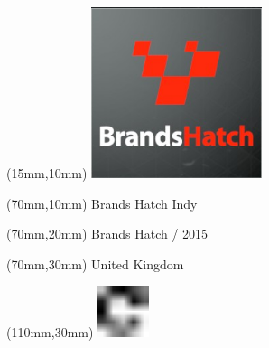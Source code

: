 \null\newpage
\begin{textblock*}{50mm}(15mm,10mm)%
\includegraphics[width=50mm]{LG/2015-05-20_00074.png}
\end{textblock*}
\begin{textblock*}{130mm}(70mm,10mm)%
{\fontsize{20}{20}\selectfont Brands Hatch Indy}\\
\end{textblock*}
\begin{textblock*}{120mm}(70mm,20mm)%
{\fontsize{16}{16}\selectfont Brands Hatch / 2015}\\
\end{textblock*}
\begin{textblock*}{120mm}(70mm,30mm)%
{\fontsize{12}{12}\selectfont United Kingdom}
\end{textblock*}
\begin{textblock*}{30mm}(110mm,30mm)%
\centering
\includegraphics[height=15mm]{icons/fa-rotate-right.pdf}
\end{textblock*}

